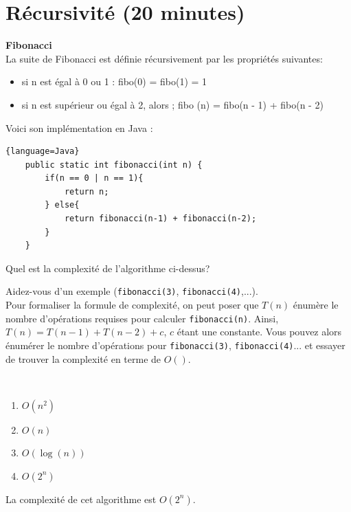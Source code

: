 \section{Récursivité (20 minutes) }
\begin{Exercice} [5 minutes] \textbf{Fibonacci}\\
\label{exercice:1}
    La suite de Fibonacci est définie récursivement par les propriétés suivantes:
    \begin{itemize}
        \item si n est égal à 0 ou 1 : fibo(0) = fibo(1) = 1
        \item si n est supérieur ou égal à 2, alors ; fibo (n) = fibo(n - 1) + fibo(n - 2)
    \end{itemize}
    
    Voici son implémentation en Java :
    
    \begin{lstlisting}{language=Java}
    public static int fibonacci(int n) {
        if(n == 0 | n == 1){
            return n;
        } else{
            return fibonacci(n-1) + fibonacci(n-2);
        }
    } \end{lstlisting}
    
    Quel est la complexité de l'algorithme ci-dessus?
    
    \begin{conseil}
    Aidez-vous d'un exemple (\lstinline{fibonacci(3)}, \lstinline{fibonacci(4)},...). \\
    Pour formaliser la formule de complexité, on peut poser que $T(n)$ énumère le nombre d'opérations requises pour calculer \lstinline{fibonacci(n)}. Ainsi, $T(n) = T(n-1) + T(n-2) + c$, $c$ étant une constante. Vous pouvez alors énumérer le nombre d'opérations pour \lstinline{fibonacci(3)}, \lstinline{fibonacci(4)}... et essayer de trouver la complexité en terme de $O()$.
    \end{conseil}
    
    \ \\
    
    \begin{enumerate}
        \item $O(n^2)$
        \item $O(n)$
        \item $O(\log(n))$
        \item $O(2^n)$
    \end{enumerate}
    
    \begin{solution}
        La complexité de cet algorithme est $O(2^n)$.
    \end{solution}
\end{Exercice}

